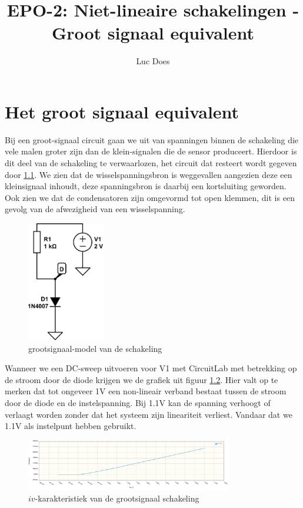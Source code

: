\documentclass{report}
\title{EPO-2: Niet-lineaire schakelingen - Groot signaal equivalent}
\author{Luc Does}
\begin{document}
\chapter{Het groot signaal equivalent}
\label{ch:Groot signaal equivalent}

Bij een groot-signaal circuit gaan we uit van spanningen binnen de schakeling die vele malen groter zijn dan de klein-signalen die de sensor produceert. Hierdoor is dit deel van de schakeling te verwaarlozen, het circuit dat resteert wordt gegeven door \ref{fig:groot}.
We zien dat de wisselspanningsbron is weggevallen aangezien deze een kleinsignaal inhoudt, deze spanningsbron is daarbij een kortsluiting geworden. Ook zien we dat de condensatoren zijn omgevormd tot open klemmen, dit is een gevolg van de afwezigheid van een wisselspanning.
\begin{figure}[H]
	\centering
	\includegraphics[width=0.3\textwidth]{grootsignaalmodel.png}
	\caption{grootsignaal-model van de schakeling}
	\label{fig:groot}
\end{figure}

\noindent Wanneer we een DC-sweep uitvoeren voor V1 met CircuitLab met betrekking op de stroom door de diode krijgen we de grafiek uit figuur \ref{fig:iv-groot}. Hier valt op te merken dat tot ongeveer 1V een non-lineair verband bestaat tussen de stroom door de diode en de instelspanning. Bij 1.1V kan de spanning verhoogt of verlaagt worden zonder dat het systeem zijn lineariteit verliest. Vandaar dat we 1.1V als instelpunt hebben gebruikt.

\begin{figure}[H]
	\centering
	\includegraphics[width=0.8\textwidth]{iv-groot.png}
	\caption{$iv$-karakteristiek van de grootsignaal schakeling}
	\label{fig:iv-groot}
\end{figure}
\end{document}
